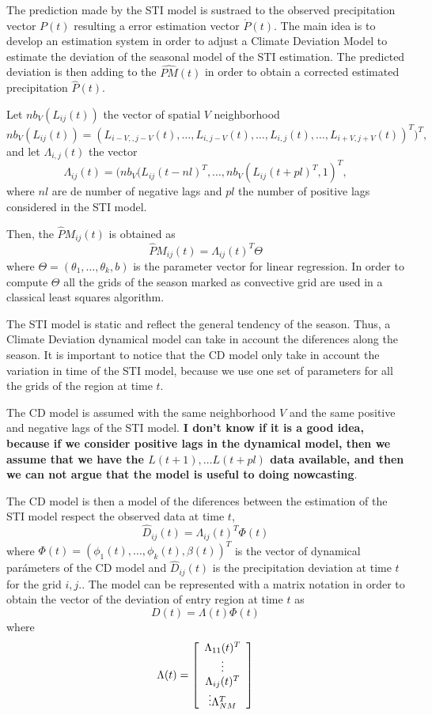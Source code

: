 \documentclass[11pt]{article}
\begin{document}
The prediction made by the STI model is sustraed to the observed precipitation vector
$P(t)$ resulting a error estimation vector $\acute{P}(t)$. The main idea is to develop an
estimation system in order to adjust a Climate Deviation Model to estimate the deviation
of the seasonal model of the STI estimation. The predicted deviation is then adding to the
$\hat{PM}(t)$ in order to obtain a corrected estimated precipitation $\hat{P}(t)$. 

Let $nb_V(L_{ij}(t))$ the vector of spatial $V$ neighborhood  
$$
nb_V(L_{ij}(t)) = (L_{i-V,,j-V}(t), \ldots, L_{i,j-V}(t), \ldots, L_{i,j}(t), \ldots, L_{i+V,j+V}(t))^T)^T,
$$
and let $\Lambda_{i,j}(t)$ the vector
$$
\Lambda_{ij}(t) = (nb_V(L_{ij}(t-nl)^T, \dots, nb_V(L_{ij}(t+pl)^T, 1 )^T,
$$ 
where $nl$ are de number of negative lags and $pl$ the number of positive lags considered
in the STI model.

Then, the $\hat{P}M_{ij}(t)$ is obtained as
$$
\hat{P}M_{ij}(t) = \Lambda_{ij}(t)^T \Theta
$$
where $\Theta = (\theta_1, \ldots, \theta_k, b)$ is the parameter vector for linear
regression. In order to compute $\Theta$ all the grids of the season marked as convective
grid are used in a classical least squares algorithm.

The STI model is static and reflect the general tendency of the season. Thus, a Climate
Deviation dynamical model can take in account the diferences along the season. It is important to
notice that the CD model only take in account the variation in time of the STI model,
because we use one set of parameters for all the grids of the region at time $t$. 

The CD model is assumed with the same neighborhood $V$ and the same positive and negative
lags of the STI model. {\bf I don't  know if it is a good idea, because if we consider
  positive lags in the dynamical model, then we assume that we have the $L(t+1), \ldots
  L(t+pl)$ data available, and then we can not argue that the model is useful to doing
  nowcasting}.

The CD model is then a model of the diferences between the estimation of the STI model
respect the observed data at time $t$, 
$$
\hat{D}_{ij}(t) = \Lambda_{ij}(t)^T \Phi(t)
$$
where $\Phi(t) = (\phi_1(t), \ldots, \phi_k(t), \beta(t))^T$ is the vector of dynamical
parámeters of the CD model and $\hat{D}_{ij}(t)$ is the precipitation deviation at time
$t$ for the grid $i,j$.. The model can be represented with a matrix notation in order
to obtain the vector of the deviation of entry region at time $t$ as
$$
D(t) = \Lambda(t) \Phi(t)
$$ 
where
$$
\Lambda(t) = \left[
  \begin{array}[c]{c}
    \Lambda_{11}(t)^T \\
    \vdots \\
    \Lambda_{ij}(t)^T \\
    \vdots
    \Lambda_{NM}^T
  \end{array}
\right]
$$
\end{document}
